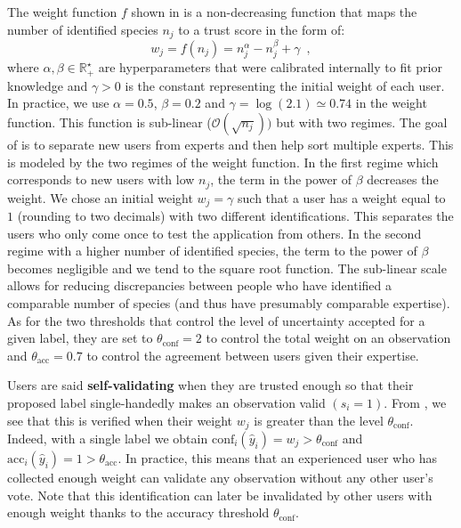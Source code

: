 The weight function $f$ shown in  is a non-decreasing function that maps the number of identified species $n_j$ to a trust score in the form of:
\begin{equation}\label{eq:weight_func}
    w_j = f(n_j) = n_j^\alpha - n_j^\beta + \gamma \enspace,
    \end{equation}
where $\alpha,\beta\in\mathbb{R_+^\star}$ are hyperparameters that were calibrated internally to fit prior knowledge and $\gamma>0$ is the constant representing the initial weight of each user. In practice, we use $\alpha=0.5$, $\beta=0.2$ and $\gamma=\log(2.1)\simeq 0.74$ in the weight function.
This function is sub-linear ($\mathcal{O}(\sqrt{n_j}))$ but with two regimes.
The goal of  is to separate new users from experts and then help sort multiple experts.
This is modeled by the two regimes of the weight function.
In the first regime which corresponds to new users with low $n_j$, the term in the power of $\beta$ decreases the weight. We chose an initial weight $w_j=\gamma$ such that a user has a weight equal to $1$ (rounding to two decimals) with two different identifications. This separates the users who only come once to test the application from others.
In the second regime with a higher number of identified species, the term to the power of $\beta$ becomes negligible and we tend to the square root function.
The sub-linear scale allows for reducing discrepancies between people who have identified a comparable number of species (and thus have presumably comparable expertise).
As for the two thresholds that control the level of uncertainty accepted for a given label, they are set to $\theta_{\text{conf}}=2$ to control the total weight on an observation and $\theta_{\text{acc}}=0.7$ to control the agreement between users given their expertise.

Users are said \textbf{self-validating} when they are trusted enough so that their proposed label single-handedly makes an observation valid $(s_i=1)$.
From , we see that this is verified when their weight $w_j$ is greater than the level $\theta_{\text{conf}}$.
Indeed, with a single label we obtain $\mathrm{conf}_i(\hat y_i) = w_j > \theta_{\text{conf}}$ and $\mathrm{acc}_i(\hat y_i) = 1 > \theta_{\text{acc}}$.
In practice, this means that an experienced user who has collected enough weight can validate any observation without any other user's vote.
Note that this identification can later be invalidated by other users with enough weight thanks to the accuracy threshold $\theta_{\text{conf}}$.

